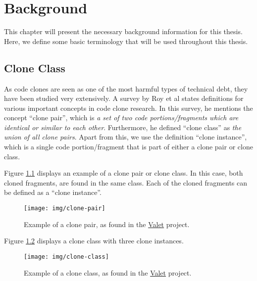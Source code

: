 \chapter{Background}
\label{ch:background}
This chapter will present the necessary background information for this thesis. Here, we define some basic terminology that will be used throughout this thesis.

\section{Clone Class}
As code clones are seen as one of the most harmful types of technical debt, they have been studied very extensively. A survey by Roy et al \cite{roy2007survey} states definitions for various important concepts in code clone research. In this survey, he mentions the concept ``clone pair'', which is \textit{a set of two code portions/fragments which are identical or similar to each other}. Furthermore, he defined ``clone class'' as \textit{the union of all clone pairs}. Apart from this, we use the definition ``clone instance'', which is a single code portion/fragment that is part of either a clone pair or clone class.

Figure \ref{fig:clonepair} displays an example of a clone pair or clone class. In this case, both cloned fragments, are found in the same class. Each of the cloned fragments can be defined as a ``clone instance''.

\begin{figure}[H]
	\centering
	\texttt{[image: img/clone-pair]}
	\caption{Example of a clone pair, as found in the \href{https://github.com/Widen/valet}{Valet} project.}
	\label{fig:clonepair}
\end{figure}

Figure \ref{fig:cloneclass} displays a clone class with three clone instances.

\begin{figure}[H]
	\centering
	\texttt{[image: img/clone-class]}
	\caption{Example of a clone class, as found in the \href{https://github.com/Widen/valet}{Valet} project.}
	\label{fig:cloneclass}
\end{figure}

